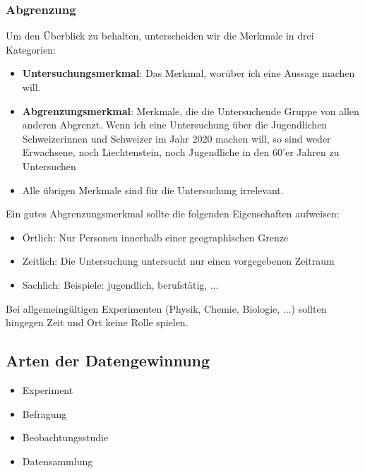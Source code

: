 \subsubsection{Abgrenzung}
Um den Überblick zu behalten, unterscheiden wir die Merkmale in drei
Kategorien:
\begin{itemize}
\item \textbf{Untersuchungsmerkmal}: Das
Merkmal, worüber ich eine Aussage machen will.
\item \textbf{Abgrenzungsmerkmal}: Merkmale,
die die Untersuchende Gruppe von allen anderen Abgrenzt. Wenn ich eine
Untersuchung über die Jugendlichen Schweizerinnen und Schweizer im
Jahr 2020 machen will, so sind weder Erwachsene, noch Liechtenstein,
noch Jugendliche in den 60'er Jahren zu Untersuchen
\item Alle übrigen Merkmale sind für die Untersuchung irrelevant.
\end{itemize}

Ein gutes Abgrenzungsmerkmal sollte die folgenden Eigenschaften
aufweisen:
\begin{itemize}
\item Örtlich: Nur Personen innerhalb einer geographischen Grenze
\item Zeitlich: Die Untersuchung untersucht nur einen vorgegebenen
Zeitraum
\item Sachlich: Beispiele: jugendlich, berufstätig, ...
\end{itemize}

Bei allgemeingültigen Experimenten (Physik, Chemie, Biologie, ...)
sollten hingegen Zeit und Ort keine Rolle spielen.


\subsection{Arten der Datengewinnung}
\begin{itemize}
 \item Experiment
 \item Befragung
 \item Beobachtungsstudie
 \item Datensammlung
\end{itemize}


